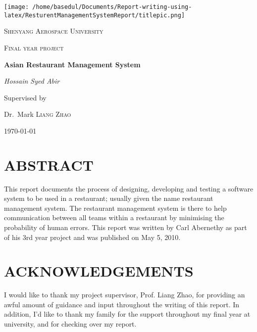 \documentclass[12pt,a4paper]{article}
\begin{document}
	
	\begin{titlepage}
	\begin{center}
	\centering
	\texttt{[image: /home/basedul/Documents/Report-writing-using-latex/ResturentManagementSystemReport/titlepic.png]}\par\vspace{1cm}
	{\scshape\LARGE Shenyang Aerospace University \par}
	\vspace{1cm}
	{\scshape\Large Final year project\par}
	\vspace{1.5cm}
	{\huge\bfseries Asian Restaurant Management System\par}
	\vspace{2cm}
	{\Large\itshape Hossain Syed Abir\par}
	\vfill
	Supervised by\par
	Dr.~Mark \textsc{Liang Zhao}

	\vfill

	{\large \today\par}
\end{center}
\end{titlepage}
	
	\section*{ABSTRACT}
	This report documents the process of designing, developing and testing a software system to be used in a
restaurant; usually given the name restaurant management system. The restaurant management system
is there to help communication between all teams within a restaurant by minimising the probability
of human errors. This report was written by Carl Abernethy as part of his 3rd year project and was
published on May 5, 2010.\\
	\section*{ACKNOWLEDGEMENTS}
	I would like to thank my project supervisor, Prof. Liang Zhao, for providing an awful amount of
guidance and input throughout the writing of this report. In addition, I’d like to thank my family for
the support throughout my final year at university, and for checking over my report.\\
\end{document}

